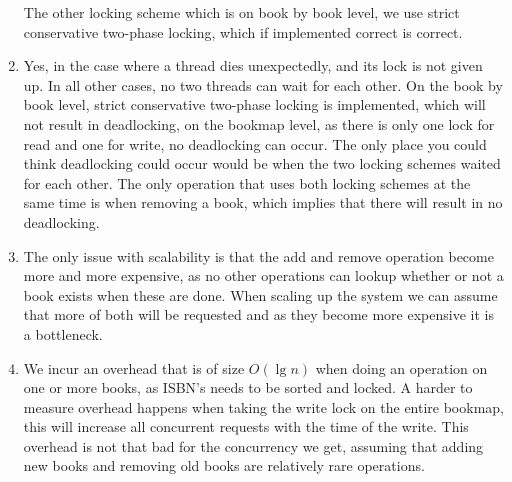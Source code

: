 \documentclass[a4paper]{article}
\begin{document}
\begin{enumerate}
The other locking scheme which is on book by book level, we use strict conservative two-phase locking, which if implemented correct is correct.
  \item Yes, in the case where a thread dies unexpectedly, and its lock is not given up. In all other cases, no two threads can wait for each other. On the book by book level, strict conservative two-phase locking is implemented, which will not result in deadlocking, on the bookmap level, as there is only one lock for read and one for write, no deadlocking can occur. The only place you could think deadlocking could occur would be when the two locking schemes waited for each other. The only operation that uses both locking schemes at the same time is when removing a book, which implies that there will result in no deadlocking.
  \item The only issue with scalability is that the add and remove operation become more and more expensive, as no other operations can lookup whether or not a book exists when these are done. When scaling up the system we can assume that more of both will be requested and as they become more expensive it is a bottleneck.
  \item We incur an overhead that is of size $O(\lg{n})$ when doing an operation on one or more books, as ISBN's needs to be sorted and locked. A harder to measure overhead happens when taking the write lock on the entire bookmap, this will increase all concurrent requests with the time of the write. This overhead is not that bad for the concurrency we get, assuming that adding new books and removing old books are relatively rare operations.
\end{enumerate}
\end{document}
